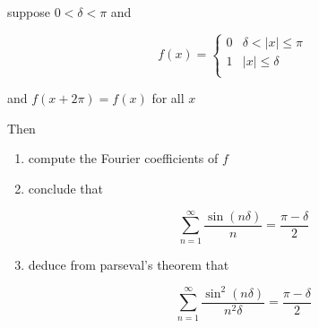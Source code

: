 \begin{exercise}
    suppose $0 < \delta < \pi$ and

    \[
        f(x) = \begin{cases}
            0 & \delta < |x| \le \pi \\
            1 & |x| \le \delta \\
        \end{cases}
    \]

    and $f(x + 2\pi) =f(x)$ for all $x$

    Then

    \begin{enumerate}
        \item compute the Fourier coefficients of $f$

        \item conclude that

        \[
            \sum_{n=1}^{\infty}\frac{\sin (n \delta)}{n} = \frac{\pi - \delta}{2}
        \]

        \item deduce from parseval's theorem that

        \[
\sum_{n=1}^{\infty} \frac{\sin^2 (n \delta)}{n^2 \delta} =  \frac{\pi - \delta}{2}
        \]
    \end{enumerate}
\end{exercise}

